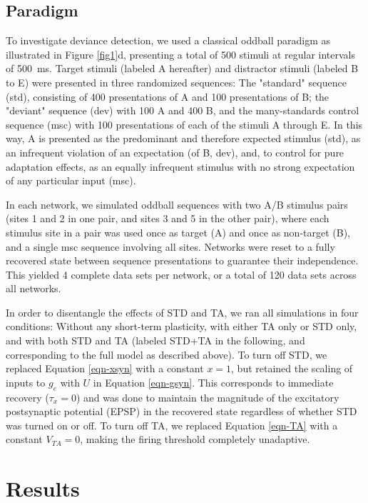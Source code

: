 \documentclass[pdflatex,referee,iicol,sn-basic]{sn-jnl}
\theoremstyle{thmstyleone}%
\theoremstyle{thmstyletwo}%
\theoremstyle{thmstylethree}%
\begin{document}
\subsection{Paradigm}\label{sec-paradigm}

To investigate deviance detection, we used a classical oddball paradigm as illustrated in Figure \ref{fig1}d, presenting a total of 500 stimuli at regular intervals of 500~ms. Target stimuli (labeled A hereafter) and distractor stimuli (labeled B to E) were presented in three randomized sequences: The "standard" sequence (std), consisting of 400 presentations of A and 100 presentations of B; the "deviant" sequence (dev) with 100 A and 400 B, and the many-standards control sequence (msc) with 100 presentations of each of the stimuli A through E. In this way, A is presented as the predominant and therefore expected stimulus (std), as an infrequent violation of an expectation (of B, dev), and, to control for pure adaptation effects, as an equally infrequent stimulus with no strong expectation of any particular input (msc).

In each network, we simulated oddball sequences with two A/B stimulus pairs (sites 1 and 2 in one pair, and sites 3 and 5 in the other pair), where each stimulus site in a pair was used once as target (A) and once as non-target (B), and a single msc sequence involving all sites. Networks were reset to a fully recovered state between sequence presentations to guarantee their independence. This yielded 4 complete data sets per network, or a total of 120 data sets across all networks.

In order to disentangle the effects of STD and TA, we ran all simulations in four conditions: Without any short-term plasticity, with either TA only or STD only, and with both STD and TA (labeled STD+TA in the following, and corresponding to the full model as described above). To turn off STD, we replaced Equation \ref{eqn-xsyn} with a constant $x = 1$, but retained the scaling of inputs to $g_e$ with $U$ in Equation \ref{eqn-gsyn}. This corresponds to immediate recovery ($\tau_x = 0$) and was done to maintain the magnitude of the excitatory postsynaptic potential (EPSP) in the recovered state regardless of whether STD was turned on or off. To turn off TA, we replaced Equation \ref{eqn-TA} with a constant $V_{TA} = 0$, making the firing threshold completely unadaptive.

\section{Results}\label{sec-results}
\end{document}
